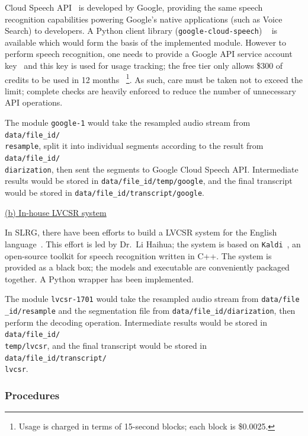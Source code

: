 Cloud Speech API~\cite{gcs} is developed by Google, providing the same speech
recognition capabilities powering Google's native applications (such as Voice
Search) to developers. A Python client library (\texttt{google-cloud-speech})
~\cite{gh-gcs} is available which would form the basis of the implemented module.
However to perform speech recognition, one needs to provide a Google API service
account key~\cite{gcs-api-key} and this key is used for usage tracking; the free
tier only allows \$300 of credits to be used in 12 months~\cite{gcs-free}
\footnote{Usage is charged in terms of 15-second blocks; each block is \$0.0025.}.
As such, care must be taken not to exceed the limit; complete checks are heavily
enforced to reduce the number of unnecessary API operations.

The module \texttt{google-1} would take the resampled audio stream from
\texttt{data/file\_id/\\ resample}, split it into individual segments according
to the result from \texttt{data/file\_id/\\diarization}, then sent the segments
to Google Cloud Speech API\@. Intermediate results would be stored in
\texttt{data/file\_id/temp/google}, and the final transcript would be stored in
\texttt{data/file\_id/transcript/google}.

\underline{(b) In-house LVCSR system}

In SLRG, there have been efforts to build a LVCSR system for the English
language~\cite{slrg}. This effort is led by Dr.\ Li Haihua; the system is based
on \texttt{Kaldi}~\cite{Povey_ASRU2011}, an open-source toolkit for speech
recognition written in C++. The system is provided as a black box; the models
and executable are conveniently packaged together. A Python wrapper has been
implemented.

The module \texttt{lvcsr-1701} would take the resampled audio stream from
\texttt{data/file\\ \_id/resample} and the segmentation file from
\texttt{data/file\_id/diarization}, then perform the decoding operation.
Intermediate results would be stored in \texttt{data/file\_id/\\ temp/lvcsr},
and the final transcript would be stored in
\texttt{data/file\_id/transcript/\\lvcsr}.

\subsubsection{Procedures}

